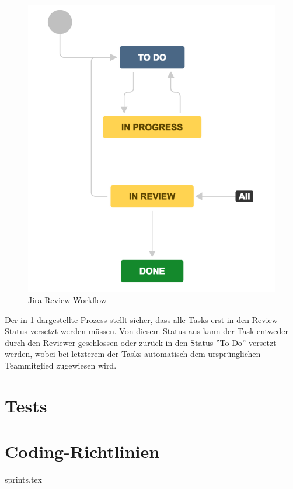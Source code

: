 \begin{figure}
\centering
\includegraphics[width=0.7\linewidth]{content/projektmanagement/fig/jira-workflow}
\caption{Jira Review-Workflow}
\label{fig:jira-workflow}
\end{figure}

Der in \cref{fig:jira-workflow} dargestellte Prozess stellt sicher, dass alle Tasks erst in den Review Status versetzt werden müssen. Von diesem Status aus kann der Task entweder durch den Reviewer geschlossen oder zurück in den Status ''To Do'' versetzt werden, wobei bei letzterem der Tasks automatisch dem ursprünglichen Teammitglied zugewiesen wird.



\section{Tests}



\section{Coding-Richtlinien}


{sprints.tex}


